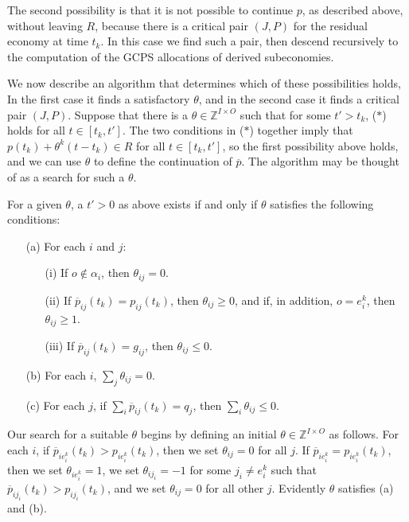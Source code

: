 \documentclass[12pt]{article}
\theoremstyle{definition}
\newcommand{\In}{\mathbb{Z}}
\newcommand{\barp}{\overline{p}}
\begin{document}
\begin{appendix}
The second possibility is that it is not possible to continue $p$, as
described above, without leaving $R$, because there is a critical pair
$(J,P)$ for the residual economy at time $t_k$.  In this case we find
such a pair, then descend recursively to the computation of the GCPS
allocations of derived subeconomies.

We now describe an algorithm that determines which of these
possibilities holds, In the first case it finds a satisfactory
$\theta$, and in the second case it finds a critical pair $(J,P)$.
Suppose that there is a $\theta \in \In^{I \times O}$ such that for
some $t' > t_k$, ($*$) holds for all $t \in [t_k,t']$.  The two
conditions in ($*$) together imply that $p(t_k) + \theta^k(t - t_k)
\in R$ for all $t \in [t_k,t']$, so the first possibility above holds,
and we can use $\theta$ to define the continuation of $\barp$.  The
algorithm may be thought of as a search for such a $\theta$.

For a given $\theta$, a $t' > 0$ as above exists if and only if
$\theta$ satisfies the following conditions:
\begin{enumerate} 
  \item[(a)] For each $i$ and $j$:
    \begin{enumerate}
      \item[(i)] If $o \notin \alpha_i$, then $\theta_{ij} = 0$.
      \item[(ii)] If $\barp_{ij}(t_k) = p_{ij}(t_k)$, then
        $\theta_{ij} \ge 0$, and if, in addition, $o = e^k_i$, then
        $\theta_{ij} \ge 1$.
      \item[(iii)] If $\barp_{ij}(t_k) = g_{ij}$, then $\theta_{ij} \le 0$.
    \end{enumerate}
  \item[(b)] For each $i$, $\sum_j \theta_{ij} = 0$.
  \item[(c)] For each $j$, if $\sum_i \barp_{ij}(t_k) = q_j$, then $\sum_i \theta_{ij} \le 0$.
\end{enumerate}


Our search for a suitable $\theta$ begins by defining an initial
$\theta \in \In^{I \times O}$ as follows.  For each $i$, if
$\barp_{ie^k_i}(t_k) > p_{ie^k_i}(t_k)$, then we set $\theta_{ij} = 0$
for all $j$.  If $\barp_{ie^k_i} = p_{ie^k_i}(t_k)$, then we set
$\theta_{ie^k_i} = 1$, we set $\theta_{ij_i} = -1$ for some $j_i \ne
e^k_i$ such that $\barp_{ij_i}(t_k) > p_{ij_i}(t_k)$, and we set
$\theta_{ij} = 0$ for all other $j$.  Evidently $\theta$ satisfies (a)
and (b).


\end{appendix}
\end{document}
